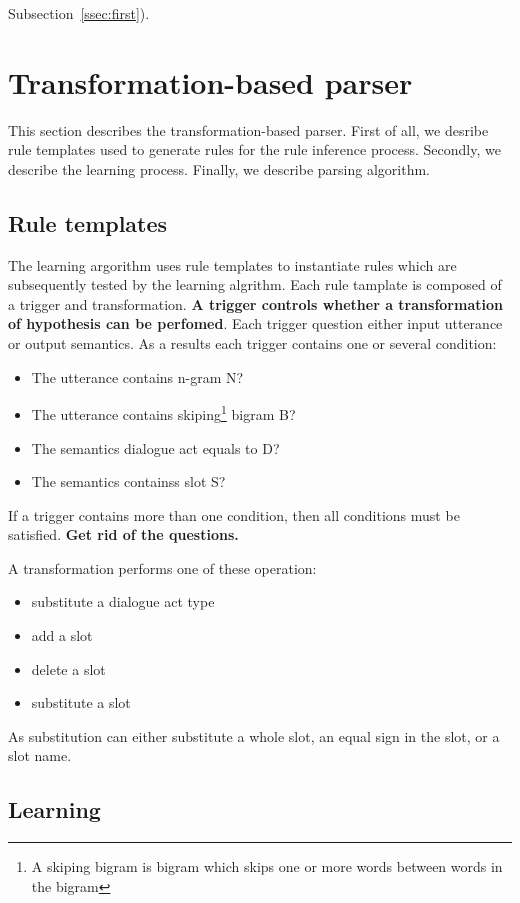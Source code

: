 \documentclass[11pt]{article}
\begin{document}
Subsection~\ref{ssec:first}).

\section{Transformation-based parser}
This section describes the transformation-based parser. First of all, we desribe rule templates used to generate rules for the rule inference process. Secondly, we describe the learning process. Finally, we describe parsing algorithm.

\subsection{Rule templates}
The learning argorithm uses rule templates to instantiate rules which are subsequently tested by the learning algrithm. Each rule tamplate is composed of a trigger and transformation. \textbf{A trigger controls whether a transformation of hypothesis can be perfomed}. Each trigger question either input utterance or output semantics. As a results each trigger contains one or several condition:
\begin{itemize}
  \item The utterance contains n-gram N?
  \item The utterance contains skiping\footnote{A skiping bigram is bigram which skips one or more words between words in the bigram} bigram B?
  \item The semantics dialogue act equals to D?
  \item The semantics containss slot S?
\end{itemize}
If a trigger contains more than one condition, then all conditions must be satisfied. \textbf{Get rid of the questions.}

A transformation performs one of these operation:
\begin{itemize}
  \item substitute a dialogue act type
  \item add a slot
  \item delete a slot
  \item substitute a slot
\end{itemize}
As substitution can either substitute a whole slot, an equal sign in the slot, or a slot name.

\subsection{Learning}
\end{document}
